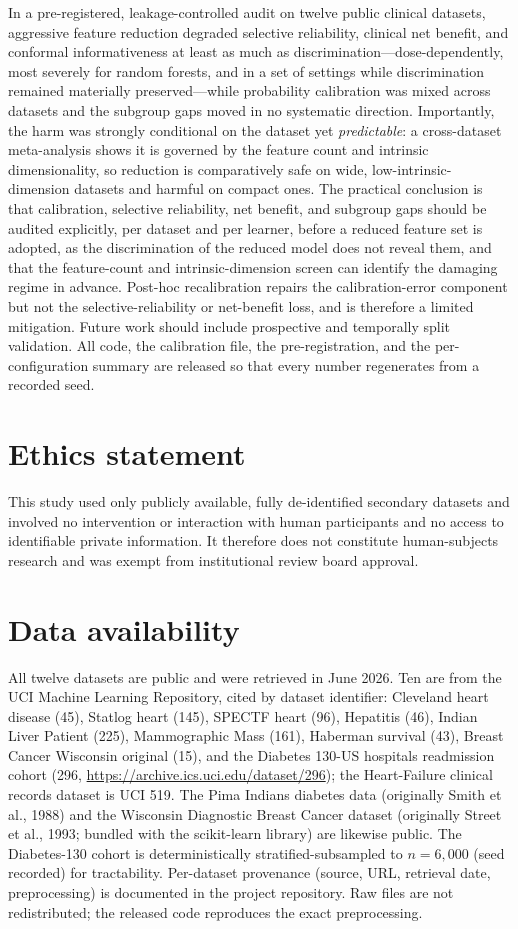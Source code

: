 \documentclass[fleqn,10pt]{wlscirep}
\begin{document}
In a pre-registered, leakage-controlled audit on twelve public clinical datasets, aggressive
feature reduction degraded selective reliability, clinical net benefit, and conformal informativeness
at least as much as discrimination---dose-dependently, most severely for random forests, and in a set
of settings while discrimination remained materially preserved---while probability calibration was
mixed across datasets and the subgroup gaps moved in no systematic direction. Importantly, the harm was
strongly conditional on the dataset yet \emph{predictable}: a cross-dataset meta-analysis shows it is
governed by the feature count and intrinsic dimensionality, so reduction is comparatively safe on wide,
low-intrinsic-dimension datasets and harmful on compact ones. The practical conclusion is that
calibration, selective reliability, net benefit, and subgroup gaps should be audited explicitly, per
dataset and per learner, before a reduced feature set is adopted, as the discrimination of the
reduced model does not reveal them, and that the feature-count and intrinsic-dimension screen can
identify the damaging regime in advance. Post-hoc recalibration repairs the calibration-error
component but not the selective-reliability or net-benefit loss, and is therefore a limited mitigation.
Future work should include prospective and temporally split validation. All code, the calibration file, the
pre-registration, and the per-configuration summary are released so that every number regenerates from
a recorded seed.

\section*{Ethics statement}
This study used only publicly available, fully de-identified secondary datasets and involved no
intervention or interaction with human participants and no access to identifiable private
information. It therefore does not constitute human-subjects research and was exempt from
institutional review board approval.

\section*{Data availability}
All twelve datasets are public and were retrieved in June 2026. Ten are from the UCI Machine Learning
Repository, cited by dataset identifier: Cleveland heart disease (45), Statlog heart (145), SPECTF
heart (96), Hepatitis (46), Indian Liver Patient (225), Mammographic Mass (161), Haberman survival
(43), Breast Cancer Wisconsin original (15), and the Diabetes 130-US hospitals readmission cohort
(296, \url{https://archive.ics.uci.edu/dataset/296}); the Heart-Failure clinical records dataset is
UCI 519. The Pima Indians diabetes data (originally Smith et al., 1988) and the Wisconsin Diagnostic
Breast Cancer dataset (originally Street et al., 1993; bundled with the scikit-learn library) are likewise public. The Diabetes-130 cohort is
deterministically stratified-subsampled to $n=6{,}000$ (seed recorded) for tractability. Per-dataset
provenance (source, URL, retrieval date, preprocessing) is documented in the project repository. Raw files are not redistributed; the released code reproduces the exact
preprocessing.
\end{document}
